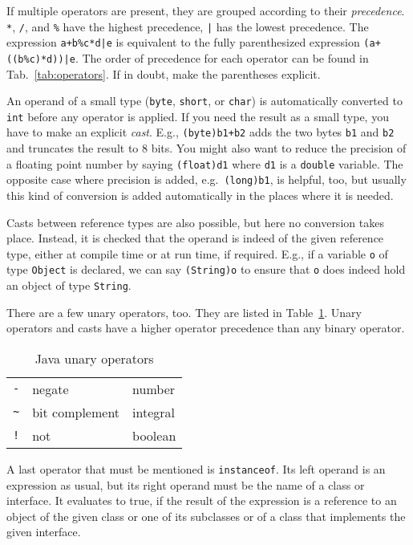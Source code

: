 If multiple operators are present, they are grouped according to
their \emph{precedence}. \texttt{*}, \texttt{/}, and \texttt{\%}
have the highest precedence, \texttt{|} has the lowest precedence.
The expression \texttt{a+b\%c*d|e} is equivalent to the
fully parenthesized expression \texttt{(a+((b\%c)*d))|e}.
The order of precedence for each operator
can be found in Tab.~\ref{tab:operators}.
If in doubt, make the parentheses explicit.

An operand of a small type
(\texttt{byte}, \texttt{short}, or \texttt{char}) is automatically
converted to \texttt{int} before any operator is applied. If
you need the result as a small type, you have to make an
explicit \emph{cast}. E.g., \texttt{(byte)b1+b2} adds the two bytes
\texttt{b1} and \texttt{b2} and truncates the result to
8 bits. You might also want to reduce the precision of a
floating point number by saying \texttt{(float)d1} where
\texttt{d1} is a \texttt{double} variable. The opposite case where
precision is added, e.g.\ \texttt{(long)b1}, is helpful, too,
but usually this kind of conversion is added automatically
in the places where it is needed.

Casts between reference types are also possible, but here no
conversion takes place. Instead, it is checked that the operand
is indeed of the given reference type, either at compile time
or at run time, if required. E.g., if a variable \texttt{o}
of type \texttt{Object} is declared, we can say \texttt{(String)o}
to ensure that \texttt{o} does indeed hold an object of type
\texttt{String}.

There are a few unary operators, too. They are listed in
Table~\ref{tab:unary}. Unary operators and casts have a higher operator
precedence than any binary operator.

\begin{table}
  \begin{center}
    \begin{tabular}{lll}
      \texttt{-} & negate & number \\
      \texttt{\~{}} & bit complement & integral \\
      \texttt{!} & not & boolean \\
    \end{tabular}
  \end{center}
  \caption{Java unary operators}
  \label{tab:unary}
\end{table}

A last operator that must be mentioned
is \texttt{instanceof}. Its left operand is an expression
as usual, but its right operand must be the name of a class or interface.
It evaluates to true, if the result of the expression is
a reference to an object of the given class or one of its subclasses
or of a class that implements the given interface.

